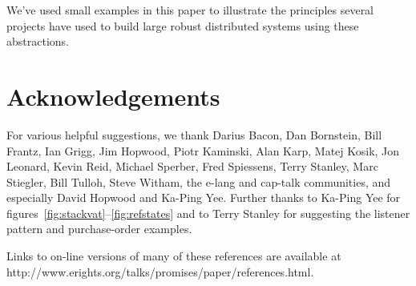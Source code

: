 \documentclass{llncs}
\begin{document}
We've used small examples in this paper to illustrate the principles
several projects have used to build large robust distributed systems
using these abstractions.

\section{Acknowledgements}
For various helpful suggestions, we thank
Darius Bacon,
Dan Bornstein,
Bill Frantz,
Ian Grigg,
Jim Hopwood,
Piotr Kaminski,
Alan Karp,
Matej Kosik,
Jon Leonard,
Kevin Reid,
Michael Sperber,
Fred Spiessens,
Terry Stanley,
Marc Stiegler,
Bill Tulloh,
Steve Witham,
the e-lang and cap-talk communities,
and especially
David Hopwood and
Ka-Ping Yee.
Further thanks to Ka-Ping Yee for
figures~\ref{fig:stackvat}--\ref{fig:refstates}
and to Terry Stanley for suggesting the listener pattern
and purchase-order examples.


%
Links to on-line versions of many of these references are available at
http://www.erights.org/talks/promises/paper/references.html.

%

\end{document}
